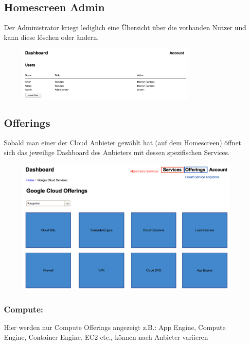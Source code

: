 \documentclass[11pt]{scrartcl}
\begin{document}
\subsection{Homescreen Admin}

Der Administrator kriegt lediglich eine Übersicht über die vorhanden Nutzer und 
kann diese löschen oder ändern.
\begin{figure}[h]
  \includegraphics[width=0.8\textwidth]{homescreen_admin}
\end{figure}


\subsection{Offerings}
Sobald man einer der Cloud Anbieter gewählt hat (auf dem Homescreen) öffnet 
sich das jeweilige Dashboard des Anbieters mit dessen spezifischen Services.
\begin{figure}[h]
  \includegraphics[width=\textwidth]{homescreen_google}
\end{figure}


\subsubsection{Compute:}

Hier werden nur Compute Offerings angezeigt z.B.: App Engine, Compute Engine, 
Container Engine, EC2 etc., können nach Anbieter variieren
\end{document}
